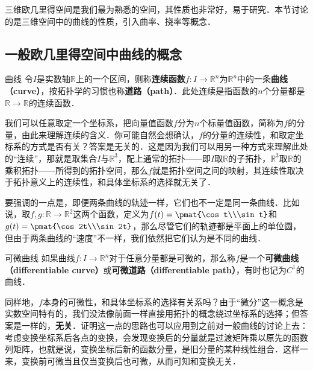 
三维欧几里得空间是我们最为熟悉的空间，其性质也非常好，易于研究．本节讨论的是三维空间中的曲线的性质，引入曲率、挠率等概念．

\subsection{一般欧几里得空间中曲线的概念}

\begin{definition}{曲线}
令$I$是实数轴$\mathbb{R}$上的一个区间，则称\textbf{连续函数}$f:I\to \mathbb{R}^n$为$\mathbb{R}^n$中的一条\textbf{曲线（curve）}，按拓扑学的习惯也称\textbf{道路（path）}．此处连续是指函数的$n$个分量都是$\mathbb{R}\to\mathbb{R}$的连续函数．
\end{definition}

我们可以任意取定一个坐标系，把向量值函数$f$分为$n$个标量值函数，简称为$f$的分量，由此来理解连续的含义．你可能自然会想确认，$f$的分量的连续性，和取定坐标系的方式是否有关？答案是无关的．这是因为我们可以用另一种方式来理解此处的“连续”，那就是取集合$I$与$\mathbb{R}^3$，配上通常的拓扑——即$I$取$\mathbb{R}$的子拓扑，$\mathbb{R}^3$取$\mathbb{R}$的乘积拓扑——所得到的拓扑空间，那么$f$就是拓扑空间之间的映射，其连续性取决于拓扑意义上的连续性，和具体坐标系的选择就无关了．

要强调的一点是，即便两条曲线的轨迹一样，它们也不一定是同一条曲线．比如说，取$f, g:\mathbb{R}\to\mathbb{R}^2$这两个函数，定义为$f(t)=\pmat{\cos t\\\sin t}$和$g(t)=\pmat{\cos 2t\\\sin 2t}$，那么尽管它们的轨迹都是平面上的单位圆，但由于两条曲线的“速度”不一样，我们依然把它们认为是不同的曲线．

\begin{definition}{可微曲线}
如果曲线$f:I\to\mathbb{R}^n$对于任意分量都是可微的，那么称$f$是一个\textbf{可微曲线（differentiable curve）}或\textbf{可微道路（differentiable path）}，有时也记为$C^1$的曲线．
\end{definition}

同样地，$f$本身的可微性，和具体坐标系的选择有关系吗？由于“微分”这一概念是实数空间特有的，我们没法像前面一样直接用拓扑的概念绕过坐标系的选择；但答案是一样的，\textbf{无关}．证明这一点的思路也可以应用到之前对一般曲线的讨论上去：考虑变换坐标系后各点的变换，会发现变换后的分量就是过渡矩阵乘以原先的函数列矩阵，也就是说，变换坐标后新的函数分量，是旧分量的某种线性组合．这样一来，变换前可微当且仅当变换后也可微，从而可知和变换无关．

